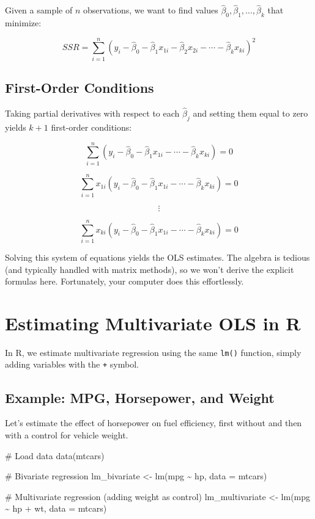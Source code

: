 \documentclass[
  letterpaper,
  DIV=11,
  numbers=noendperiod]{scrreprt}
\newenvironment{Shaded}{\begin{snugshade}}{\end{snugshade}}
\newcommand{\AttributeTok}[1]{\textcolor[rgb]{0.40,0.45,0.13}{#1}}
\newcommand{\CommentTok}[1]{\textcolor[rgb]{0.37,0.37,0.37}{#1}}
\newcommand{\FunctionTok}[1]{\textcolor[rgb]{0.28,0.35,0.67}{#1}}
\newcommand{\NormalTok}[1]{\textcolor[rgb]{0.00,0.23,0.31}{#1}}
\newcommand{\OtherTok}[1]{\textcolor[rgb]{0.00,0.23,0.31}{#1}}
\newcommand{\SpecialCharTok}[1]{\textcolor[rgb]{0.37,0.37,0.37}{#1}}
\begin{document}
Given a sample of \(n\) observations, we want to find values
\(\hat{\beta}_0, \hat{\beta}_1, \ldots, \hat{\beta}_k\) that minimize:

\[
SSR = \sum_{i=1}^{n} (y_i - \hat{\beta}_0 - \hat{\beta}_1 x_{1i} - \hat{\beta}_2 x_{2i} - \cdots - \hat{\beta}_k x_{ki})^2
\]

\subsection{First-Order Conditions}\label{first-order-conditions-1}

Taking partial derivatives with respect to each \(\hat{\beta}_j\) and
setting them equal to zero yields \(k + 1\) first-order conditions:

\[
\sum_{i=1}^{n}(y_i - \hat{\beta}_0 - \hat{\beta}_1 x_{1i} - \cdots - \hat{\beta}_k x_{ki}) = 0
\]

\[
\sum_{i=1}^{n} x_{1i}(y_i - \hat{\beta}_0 - \hat{\beta}_1 x_{1i} - \cdots - \hat{\beta}_k x_{ki}) = 0
\]

\[
\vdots
\]

\[
\sum_{i=1}^{n} x_{ki}(y_i - \hat{\beta}_0 - \hat{\beta}_1 x_{1i} - \cdots - \hat{\beta}_k x_{ki}) = 0
\]

Solving this system of equations yields the OLS estimates. The algebra
is tedious (and typically handled with matrix methods), so we won't
derive the explicit formulas here. Fortunately, your computer does this
effortlessly.

\section{Estimating Multivariate OLS in
R}\label{estimating-multivariate-ols-in-r}

In R, we estimate multivariate regression using the same \texttt{lm()}
function, simply adding variables with the \texttt{+} symbol.

\subsection{Example: MPG, Horsepower, and
Weight}\label{example-mpg-horsepower-and-weight}

Let's estimate the effect of horsepower on fuel efficiency, first
without and then with a control for vehicle weight.

\begin{Shaded}
\begin{Highlighting}[]
\CommentTok{\# Load data}
\FunctionTok{data}\NormalTok{(mtcars)}

\CommentTok{\# Bivariate regression}
\NormalTok{lm\_bivariate }\OtherTok{\textless{}{-}} \FunctionTok{lm}\NormalTok{(mpg }\SpecialCharTok{\textasciitilde{}}\NormalTok{ hp, }\AttributeTok{data =}\NormalTok{ mtcars)}

\CommentTok{\# Multivariate regression (adding weight as control)}
\NormalTok{lm\_multivariate }\OtherTok{\textless{}{-}} \FunctionTok{lm}\NormalTok{(mpg }\SpecialCharTok{\textasciitilde{}}\NormalTok{ hp }\SpecialCharTok{+}\NormalTok{ wt, }\AttributeTok{data =}\NormalTok{ mtcars)}
\end{Highlighting}
\end{Shaded}
\end{document}
